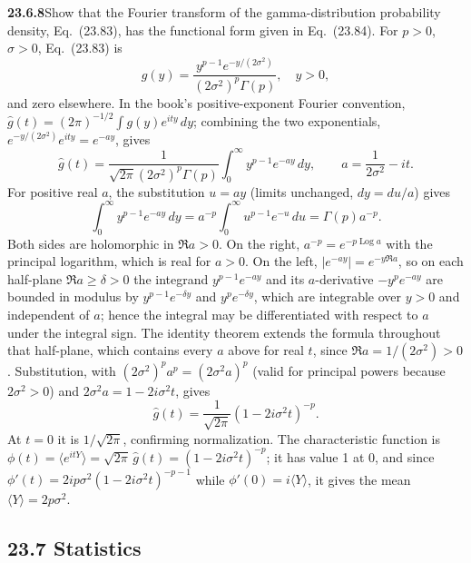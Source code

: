 \par\bigskip
\noindent\textbf{23.6.8}\quad Show that the Fourier transform of
the gamma-distribution probability density, Eq.~(23.83), has the
functional form given in Eq.~(23.84).
\solution
For $p>0$, $\sigma>0$, Eq.~(23.83) is
\[
g(y)=\frac{y^{p-1}e^{-y/(2\sigma^2)}}{(2\sigma^2)^p\Gamma(p)},
\quad y>0,
\]
and zero elsewhere. In the book's positive-exponent Fourier convention,
$\widehat g(t)=(2\pi)^{-1/2}\int g(y)e^{ity}\,dy$; combining the two
exponentials, $e^{-y/(2\sigma^2)}e^{ity}=e^{-ay}$, gives
\[
\widehat g(t)=\frac1{\sqrt{2\pi}(2\sigma^2)^p\Gamma(p)}
 \int_0^\infty y^{p-1}e^{-ay}\,dy,
\qquad a=\frac1{2\sigma^2}-it.
\]
For positive real $a$, the substitution $u=ay$ (limits unchanged,
$dy=du/a$) gives
\[
\int_0^\infty y^{p-1}e^{-ay}\,dy
=a^{-p}\int_0^\infty u^{p-1}e^{-u}\,du=\Gamma(p)a^{-p}.
\]
Both sides are holomorphic in $\Re a>0$. On the right,
$a^{-p}=e^{-p\operatorname{Log}a}$ with the principal logarithm, which
is real for $a>0$. On the left, $|e^{-ay}|=e^{-y\Re a}$, so on each
half-plane $\Re a\ge\delta>0$ the integrand $y^{p-1}e^{-ay}$ and its
$a$-derivative $-y^pe^{-ay}$ are bounded in modulus by
$y^{p-1}e^{-\delta y}$ and $y^pe^{-\delta y}$, which are integrable over
$y>0$ and independent of $a$; hence the integral may be differentiated
with respect to $a$ under the integral sign.
The identity theorem extends the formula throughout that half-plane,
which contains every $a$ above for real $t$, since
$\Re a=1/(2\sigma^2)>0$. Substitution, with
$(2\sigma^2)^pa^p=(2\sigma^2a)^p$ (valid for principal powers because
$2\sigma^2>0$) and
$2\sigma^2a=1-2i\sigma^2t$, gives
\[
\boxed{\widehat g(t)=\frac1{\sqrt{2\pi}}
 (1-2i\sigma^2t)^{-p}}.
\]
At $t=0$ it is $1/\sqrt{2\pi}$, confirming normalization.
The characteristic function is
$\phi(t)=\langle e^{itY}\rangle=\sqrt{2\pi}\,\widehat g(t)
=(1-2i\sigma^2t)^{-p}$; it has value 1 at 0, and since
$\phi'(t)=2ip\sigma^2(1-2i\sigma^2t)^{-p-1}$ while
$\phi'(0)=i\langle Y\rangle$, it gives the mean
$\langle Y\rangle=2p\sigma^2$.


\subsection*{23.7 Statistics}

